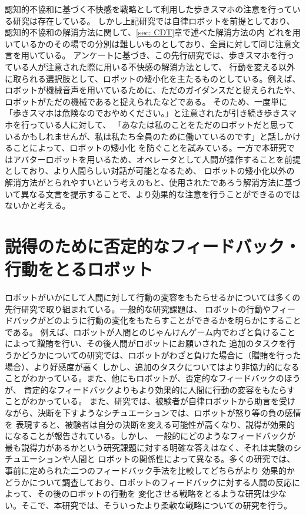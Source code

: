 \documentclass[11pt,a4j]{jreport}
\begin{document}
認知的不協和に基づく不快感を戦略として利用した歩きスマホの注意を行っている研究は存在している\cite{Schneider2022}。
しかし上記研究では自律ロボットを前提としており、認知的不協和の解消方法に関して、\ref{sec: CDT}章で述べた解消方法の内
どれを用いているかのその場での分別は難しいものとしており、全員に対して同じ注意文言を用いている。
アンケートに基づき、この先行研究では、歩きスマホを行っている人が注意された際に用いる不快感の解消方法として、
行動を変える以外に取られる選択肢として、ロボットの矮小化を主たるものとしている。例えば、
ロボットが機械音声を用いているために、ただのガイダンスだと捉えられたや、ロボットがただの機械であると捉えられたなどである。
そのため、一度単に「歩きスマホは危険なのでおやめください。」と注意されたが引き続き歩きスマホを行っている人に対して、
「あなたは私のことをただのロボットだと思っているかもしれませんが、私は私たち全員のために働いているのです」と話しかけることによって、ロボットの矮小化
を防ぐことを試みている。一方で本研究ではアバターロボットを用いるため、オペレータとして人間が操作することを前提としており、より人間らしい対話が可能となるため、
ロボットの矮小化以外の解消方法がとられやすいという考えのもと、使用されたであろう解消方法に基づいて異なる文言を提示することで、より効果的な注意を行うことができるのではないかと考える。

\section{説得のために否定的なフィードバック・行動をとるロボット}
ロボットがいかにして人間に対して行動の変容をもたらせるかについては多くの先行研究で取り組まれている。一般的な研究課題は、
ロボットの行動やフィードバックがどのように行動の変化をもたらすことができるかを明らかにすることである。
例えば、ロボットが人間とのじゃんけんゲーム内でわざと負けることによって贈賄を行い、その後人間がロボットにお願いされた
追加のタスクを行うかどうかについての研究\cite{sandoval2016can}では、ロボットがわざと負けた場合に（贈賄を行った場合）、より好感度が高く
しかし、追加のタスクについてはより非協力的になることがわかっている。また、他にもロボットが、否定的なフィードバックのほうが、
肯定的なフィードバックよりもより効果的に人間に行動の変容をもたらすことがわかっている\cite{Midden2009}。
また、研究\cite{paradeda2019makes}では、被験者が自律ロボットから助言を受けながら、決断を下すようなシチュエーションでは、ロボットが怒り等の負の感情を
表現すると、被験者は自分の決断を変える可能性が高くなり、説得が効果的になることが報告されている。しかし、
一般的にどのようなフィードバックが最も説得力があるかという研究課題に対する明確な答えはなく、それは実験のシチュエーションや人間と
ロボットの関係性によって異なる。多くの研究では、事前に定められた二つのフィードバック手法を比較してどちらがより
効果的かどうかについて調査しており、ロボットのフィードバックに対する人間の反応によって、その後のロボットの行動を
変化させる戦略をとるような研究は少ない。そこで、本研究では、そういったより柔軟な戦略についての研究を行う。
\end{document}
